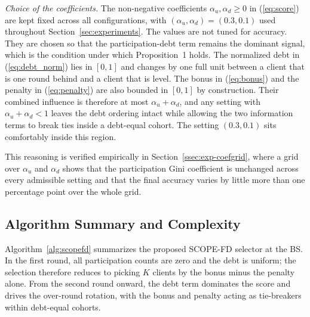 \documentclass[journal]{IEEEtran}
\newcommand{\rev}[1]{#1}
\begin{document}
\rev{\textit{Choice of the coefficients.} The non-negative coefficients $\alpha_u, \alpha_d \ge 0$ in (\ref{eq:score}) are kept fixed across all configurations, with $(\alpha_u, \alpha_d) = (0.3, 0.1)$ used throughout Section~\ref{sec:experiments}. The values are not tuned for accuracy. They are chosen so that the participation-debt term remains the dominant signal, which is the condition under which Proposition~1 holds. The normalized debt in (\ref{eq:debt_norm}) lies in $[0,1]$ and changes by one full unit between a client that is one round behind and a client that is level. The bonus in (\ref{eq:bonus}) and the penalty in (\ref{eq:penalty}) are also bounded in $[0,1]$ by construction. Their combined influence is therefore at most $\alpha_u + \alpha_d$, and any setting with $\alpha_u + \alpha_d < 1$ leaves the debt ordering intact while allowing the two information terms to break ties inside a debt-equal cohort. The setting $(0.3, 0.1)$ sits comfortably inside this region.

This reasoning is verified empirically in Section~\ref{ssec:exp-coefgrid}, where a grid over $\alpha_u$ and $\alpha_d$ shows that the participation Gini coefficient is unchanged across every admissible setting and that the final accuracy varies by little more than one percentage point over the whole grid.}

\subsection{Algorithm Summary and Complexity}
\label{ssec:algorithm-summary}

Algorithm~\ref{alg:scopefd} summarizes the proposed SCOPE-FD selector at the BS. In the first round, all participation counts are zero and the debt is uniform; the selection therefore reduces to picking $K$ clients by the bonus minus the penalty alone. From the second round onward, the debt term dominates the score and drives the over-round rotation, with the bonus and penalty acting as tie-breakers within debt-equal cohorts.
\end{document}
